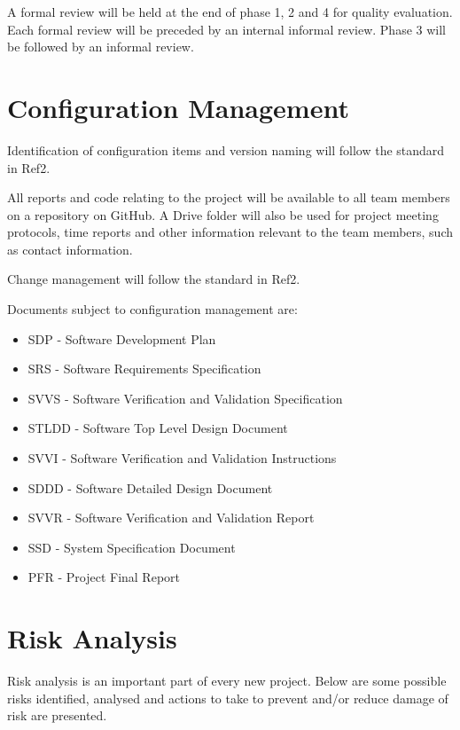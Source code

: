 \documentclass[a4paper]{article}
\begin{document}
A formal review will be held at the end of phase 1, 2 and 4 for quality evaluation. Each formal review will be preceded by an internal informal review. Phase 3 will be followed by an informal review.

\section{Configuration Management}
Identification of configuration items and version naming will follow the standard in Ref2. 

All reports and code relating to the project will be available to all team members on a repository on GitHub. A Drive folder will also be used for project meeting protocols, time reports and other information relevant to the team members, such as contact information.

Change management will follow the standard in Ref2.

Documents subject to configuration management are:
\begin{itemize}
\item SDP - Software Development Plan
\item SRS - Software Requirements Specification
\item SVVS - Software Verification and Validation Specification
\item STLDD - Software Top Level Design Document
\item SVVI - Software Verification and Validation Instructions
\item SDDD - Software Detailed Design Document
\item SVVR - Software Verification and Validation Report
\item SSD - System Specification Document
\item PFR - Project Final Report
\end{itemize}

\section{Risk Analysis}

Risk analysis is an important part of every new project. Below are some possible risks identified, analysed and actions to take to prevent and/or reduce damage of risk are presented.  
\end{document}
